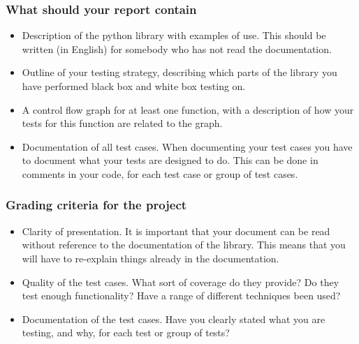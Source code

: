 \documentclass[a4page]{article}
\begin{document}
  \subsubsection*{What should your report contain}
  \begin{itemize}
  \item Description of the python library with examples of use. 
  This should be written (in English) for somebody who has not read the documentation.
  \item Outline of your testing strategy, describing which parts of the library 
    you have performed black box and white box testing on.
  \item A control flow graph for at least one function, with a description of 
    how your tests for this function are related to the graph.
  \item Documentation of all test cases.  When documenting your test cases
    you have to document what your tests are designed to do. This can be done
    in comments in your code, for each test case or group of test cases.
  \end{itemize}
\subsubsection*{Grading criteria for the project}
\begin{itemize}
\item Clarity of presentation. It is important that your document can
  be read without reference to the documentation of the library. This
  means that you will have to re-explain things already in the
  documentation. 
\item Quality of the test cases. What sort of coverage do they
  provide? Do they test enough functionality? Have a range of different 
  techniques been used?
\item Documentation of the test cases. Have you clearly stated what you are
  testing, and why, for each test or group of tests? 

 
\end{itemize}
\end{document}
